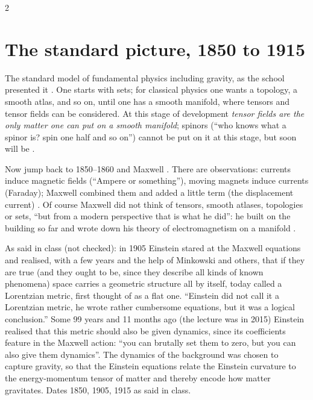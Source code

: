 \begin{paracol}{2}
\section{The standard picture, 1850 to 1915}\label{sec:c26-history}

The standard model of fundamental physics including gravity, as the school presented it . One starts with sets; for classical physics one wants a topology, a smooth atlas, and so on, until one has a smooth manifold, where tensors and tensor fields can be considered. At this stage of development \emph{tensor fields are the only matter one can put on a smooth manifold}; spinors (``who knows what a spinor is? spin one half and so on'') cannot be put on it at this stage, but soon will be .

Now jump back to 1850--1860 and Maxwell . There are observations: currents induce magnetic fields (``Ampere or something''), moving magnets induce currents (Faraday); Maxwell combined them and added a little term (the displacement current) . Of course Maxwell did not think of tensors, smooth atlases, topologies or sets, ``but from a modern perspective that is what he did'': he built on the building so far and wrote down his theory of electromagnetism on a manifold .

\begin{history}
As said in class (not checked): in 1905 Einstein stared at the Maxwell equations and realised, with a few years and the help of Minkowski and others, that if they are true (and they ought to be, since they describe all kinds of known phenomena) space carries a geometric structure all by itself, today called a Lorentzian metric, first thought of as a flat one. ``Einstein did not call it a Lorentzian metric, he wrote rather cumbersome equations, but it was a logical conclusion.'' Some 99 years and 11 months ago (the lecture was in 2015) Einstein realised that this metric should also be given dynamics, since its coefficients feature in the Maxwell action: ``you can brutally set them to zero, but you can also give them dynamics''. The dynamics of the background was chosen to capture gravity, so that the Einstein equations relate the Einstein curvature to the energy-momentum tensor of matter and thereby encode how matter gravitates. Dates 1850, 1905, 1915 as said in class.
\end{history}


\end{paracol}
